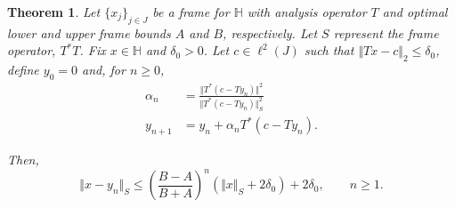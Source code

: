 \documentclass[11pt]{amsart}
\newcounter{Theorem}
\numberwithin{Theorem}{section}
\newtheorem{theorem}[Theorem]{Theorem}
\theoremstyle{definition}
\begin{document}
\begin{theorem} \label{thm:robust}
Let $\lbrace x_{j} \rbrace_{j\in J}$ be a frame for $\mathbb{H}$ with analysis operator $T$ and optimal lower and upper frame bounds $A$ and $B$, respectively.  Let $S$ represent the frame operator, $T^{*}T$.  Fix $x\in \mathbb{H}$ and $\delta_{0} >0$.  Let $c\in \ell^{2}(J)$ such that $\Vert Tx-c\Vert_{2} \le \delta_{0}$, define $y_{0}=0$ and, for $n\ge 0$, 
\begin{equation} \label{eq:greedy-2}
\begin{aligned}
\alpha_{n} &= \frac{\Vert T^{*}(c-Ty_{n})\Vert^{2}}{\Vert T^{*}(c-Ty_{n})\Vert_{S}^{2}} \\[4pt]
y_{n+1} &= y_{n} + \alpha_{n} T^{*}(c-Ty_{n}).
\end{aligned}
\end{equation}

\noindent
Then, 
\begin{equation} \label{eq:bound-2}
\Vert x-y_{n} \Vert_{S} \le \left ( \frac{B-A}{B+A} \right )^{n} \left ( \Vert x \Vert_{S} + 2\delta_{0}\right ) +  2\delta_{0}, \qquad n\ge 1.
\end{equation}
\end{theorem}
\end{document}
